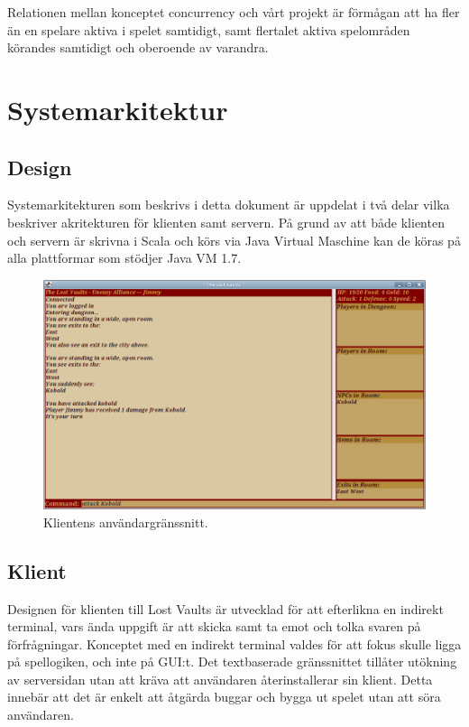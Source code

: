 \documentclass[a4paper]{article}
\begin{document}
Relationen mellan konceptet concurrency och vårt projekt är förmågan att ha fler än en spelare aktiva i spelet samtidigt, samt flertalet aktiva spelområden körandes samtidigt och oberoende av varandra.

\section{Systemarkitektur}
\subsection{Design}
Systemarkitekturen som beskrivs i detta dokument är uppdelat i två delar vilka beskriver akritekturen för klienten samt servern. På grund av att både klienten och servern är skrivna i Scala och körs via Java Virtual Maschine kan de köras på alla plattformar som stödjer Java VM 1.7.
\begin{figure}[hbt]
\centering
\includegraphics[width=1.0\textwidth]{client}
\caption{\label{fig:Client}Klientens användargränssnitt.}
\end{figure}

\subsection{Klient}
Designen för klienten till Lost Vaults är utvecklad för att efterlikna en indirekt terminal, vars ända uppgift är att skicka samt ta emot och tolka svaren på förfrågningar. Konceptet med en indirekt terminal valdes för att fokus skulle ligga på spellogiken, och inte på GUI:t. Det textbaserade gränssnittet tillåter utökning av serversidan utan att kräva att användaren återinstallerar sin klient. Detta innebär att det är enkelt att åtgärda buggar och bygga ut spelet utan att söra användaren. 
\end{document}
